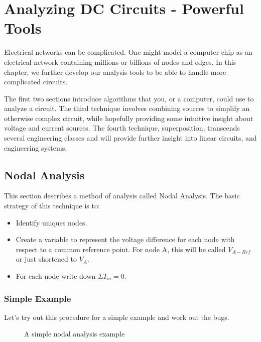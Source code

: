 
\chapter{Analyzing DC Circuits - Powerful Tools}

Electrical networks can be complicated. One might model a computer chip as an electrical network containing millions or billions of nodes and edges. In this chapter, we further develop our analysis tools to be able to handle more complicated circuits.
\par
The first two sections introduce algorithms that you, or a computer, could use to analyze a circuit. The third technique involves combining sources to simplify an otherwise complex circuit, while hopefully providing some intuitive insight about voltage and current sources. The fourth technique, superposition, transcends several engineering classes and will provide further insight into linear circuits, and engineering systems.
\par
\section{Nodal Analysis}
This section describes a method of analysis called Nodal Analysis. The basic strategy of this technique is to:
\begin{itemize}
\item Identify uniques nodes.
\item Create a variable to represent the voltage difference for each node with respect to a common reference point. For node A, this will be called $V_{A-Ref}$ or just shortened to $V_A$.
\item For each node write down $\Sigma I_{in}=0$. 
\end{itemize}

\subsection{Simple Example}
Let's try out this procedure for a simple example and work out the bugs.

\begin{figure}[H]
\begin{center}
\caption{A simple nodal analysis example}
\end{center}
\end{figure}

